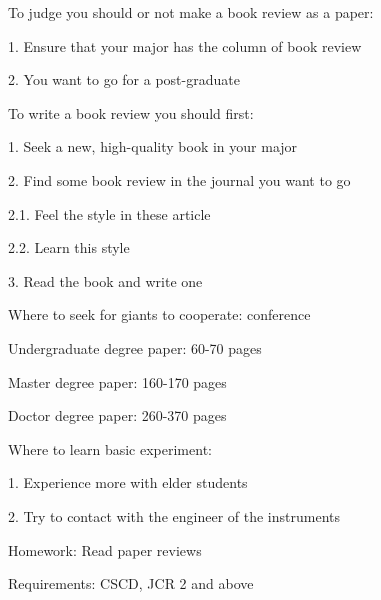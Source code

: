 \begin{notation}
    To judge you should or not make a book review as a paper:

    1. Ensure that your major has the column of book review

    2. You want to go for a post-graduate
\end{notation}

\begin{notation}
    To write a book review you should first:

    1. Seek a new, high-quality book in your major

    2. Find some book review in the journal you want to go

    2.1. Feel the style in these article

    2.2. Learn this style

    3. Read the book and write one
\end{notation}
\begin{notation}
    Where to seek for giants to cooperate: conference
\end{notation}
\begin{notation}
    Undergraduate degree paper: 60-70 pages
   
    Master degree paper: 160-170 pages

    Doctor degree paper: 260-370 pages
\end{notation}
\begin{notation}
    Where to learn basic experiment: 

    1. Experience more with elder students

    2. Try to contact with the engineer of the instruments
\end{notation}
Homework: Read paper reviews

Requirements: CSCD, JCR 2 and above
